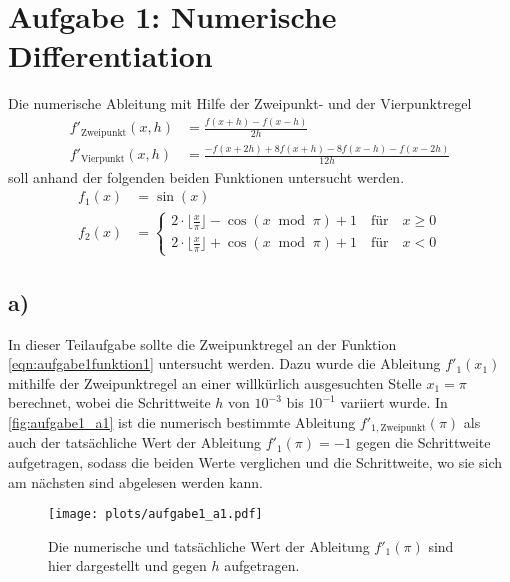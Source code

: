 \newpage
\section{Aufgabe 1: Numerische Differentiation}
  \label{sec:auf1}
  Die numerische Ableitung mit Hilfe der Zweipunkt- und der Vierpunktregel
  \begin{align}
    f'_{\mathrm{Zweipunkt}}(x,h) &= \frac{f(x+h) - f(x-h)}{2h} \\[10pt]
    f'_{\mathrm{Vierpunkt}}(x,h) &= \frac{-f(x+2h) + 8f(x+h) - 8f(x-h) - f(x-2h)}{12h}
  \end{align}
  soll anhand der folgenden beiden Funktionen untersucht werden.
  \begin{align}
    \label{eqn:aufgabe1funktion1}
    f_1(x) &= \sin(x)\\[2pt]
    \label{eqn:aufgabe1funktion2}
    f_2(x) &= \left\{
      \begin{matrix}
        2\cdot \lfloor\frac{x}{\pi} \rfloor -\cos(x \;\;\text{mod}\;\; \pi) + 1 \quad \text{für} \quad x \geq 0 \\[5pt]
        2\cdot \lfloor\frac{x}{\pi} \rfloor +\cos(x \;\;\text{mod}\;\; \pi) + 1 \quad \text{für} \quad x < 0
      \end{matrix}
      \right.
  \end{align}

  \subsection{a)}
    In dieser Teilaufgabe sollte die Zweipunktregel an der Funktion \ref{eqn:aufgabe1funktion1} untersucht werden.
    Dazu wurde die Ableitung $f'_1(x_1)$ mithilfe der Zweipunktregel an einer willkürlich ausgesuchten Stelle $x_1 = \pi$ berechnet, wobei die Schrittweite $h$ von $10^{-3}$ bis $10^{-1}$ variiert wurde.
    In \autoref{fig:aufgabe1_a1} ist die numerisch bestimmte Ableitung $f'_{\mathrm{1,Zweipunkt}}(\pi)$ als auch der tatsächliche Wert der Ableitung $f'_1(\pi) = -1$ gegen die Schrittweite aufgetragen, sodass die beiden Werte verglichen und die Schrittweite, wo sie sich am nächsten sind abgelesen werden kann.
    
    \begin{figure}[ht]
      \centering
      \texttt{[image: plots/aufgabe1\_a1.pdf]} \vspace*{-0.6cm}
      \caption{Die numerische und tatsächliche Wert der Ableitung $f'_1(\pi)$ sind hier dargestellt und gegen $h$ aufgetragen.}
      \label{fig:aufgabe1_a1}
    \end{figure}
    \FloatBarrier


